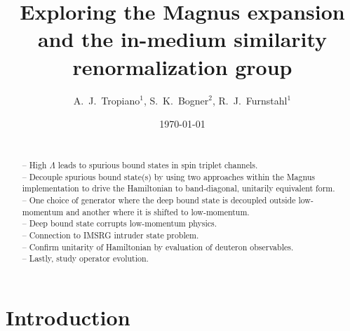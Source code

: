 \documentclass[preprintnumbers,floatfix,aps,prc,preprint,nofootinbib]{revtex4-1}
\begin{document}
\title{Exploring the Magnus expansion and the in-medium similarity renormalization group}


\author{A.~J.~Tropiano$^{1}$, S.~K.~Bogner$^{2}$, R.~J.~Furnstahl$^{1}$}


\date{\today}

\begin{abstract}
\\
-- High $\Lambda$ leads to spurious bound states in spin triplet channels.
\\
-- Decouple spurious bound state(s) by using two approaches within the Magnus implementation to drive the Hamiltonian to band-diagonal, unitarily equivalent form.
\\
-- One choice of generator where the deep bound state is decoupled outside low-momentum and another where it is shifted to low-momentum.
\\
-- Deep bound state corrupts low-momentum physics.
\\
-- Connection to IMSRG intruder state problem.
\\
-- Confirm unitarity of Hamiltonian by evaluation of deuteron observables.
\\
-- Lastly, study operator evolution.
\end{abstract}


\maketitle

\newpage


\section{Introduction}
\label{sec:intro}
\end{document}
